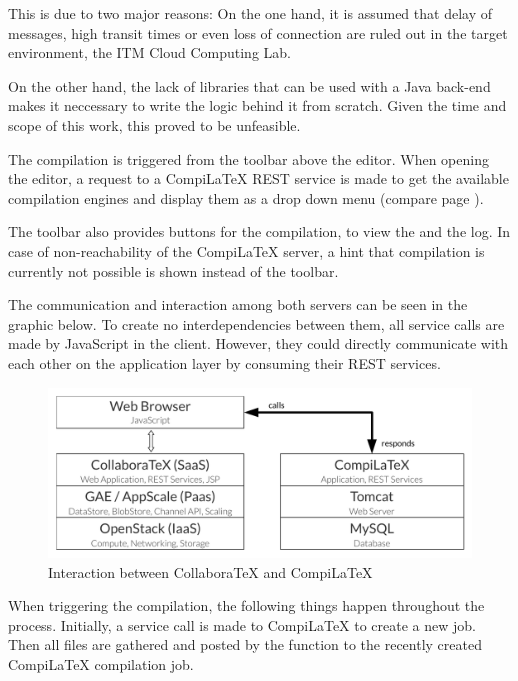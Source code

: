 This is due to two major reasons: On the one hand, it is assumed that delay of messages, high transit times or even loss of connection are ruled out in the target environment, the ITM Cloud Computing Lab. 

On the other hand, the lack of  libraries that can be used with a Java back-end makes it neccessary to write the logic behind it from scratch. Given the time and scope of this work, this proved to be unfeasible.


The compilation is triggered from the toolbar above the editor. When opening the editor, a request to a CompiLaTeX REST service is made to get the available compilation engines and display them as a drop down menu (compare page \pageref{subsubsec:compilatex-services}). 

The toolbar also provides buttons for the compilation, to view the  and the log. In case of non-reachability of the CompiLaTeX server, a hint that compilation is currently not possible is shown instead of the toolbar.

The communication and interaction among both servers can be seen in the graphic below. To create no interdependencies between them, all service calls are made by JavaScript in the client. However, they could directly communicate with each other on the application layer by consuming their REST services.

\begin{figure}[H]
	\centering
		\includegraphics[width=\textwidth]{images/cotex_architecture.pdf}
	\caption{Interaction between CollaboraTeX and CompiLaTeX}
\end{figure}

When triggering the compilation, the following things happen throughout the process. Initially, a service call is made to CompiLaTeX to create a new job. Then all files are gathered and posted by the function  to the recently created CompiLaTeX compilation job. 

